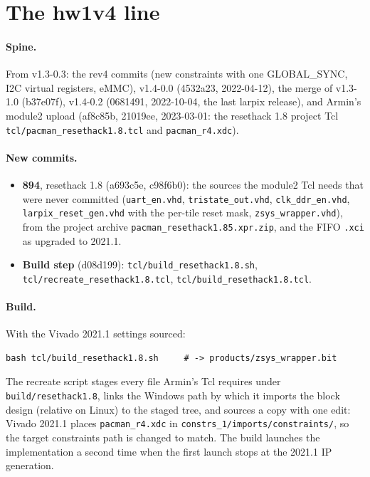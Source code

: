 \documentclass[11pt]{article}
\newcommand{\h}[1]{\texttt{#1}}
\begin{document}
\section{The hw1v4 line}

\paragraph{Spine.}  From v1.3-0.3: the rev4 commits (new constraints with one GLOBAL\_SYNC, I2C virtual
registers, eMMC), v1.4-0.0 (4532a23, 2022-04-12), the merge of v1.3-1.0 (b37e07f), v1.4-0.2 (0681491,
2022-10-04, the last larpix release), and Armin's module2 upload (af8c85b, 21019ee, 2023-03-01: the resethack 1.8
project Tcl \h{tcl/pacman\_resethack1.8.tcl} and \h{pacman\_r4.xdc}).

\paragraph{New commits.}
\begin{itemize}
\item \textbf{894}, resethack 1.8 (a693c5e, c98f6b0): the sources the module2 Tcl needs that were never
  committed (\h{uart\_en.vhd}, \h{tristate\_out.vhd}, \h{clk\_ddr\_en.vhd}, \h{larpix\_reset\_gen.vhd} with the
  per-tile reset mask, \h{zsys\_wrapper.vhd}), from the project archive \h{pacman\_resethack1.85.xpr.zip}, and the
  FIFO \h{.xci} as upgraded to 2021.1.
\item \textbf{Build step} (d08d199): \h{tcl/build\_resethack1.8.sh}, \h{tcl/recreate\_resethack1.8.tcl},
  \h{tcl/build\_resethack1.8.tcl}.
\end{itemize}

\paragraph{Build.}  With the Vivado 2021.1 settings sourced:
\begin{verbatim}
bash tcl/build_resethack1.8.sh     # -> products/zsys_wrapper.bit
\end{verbatim}
The recreate script stages every file Armin's Tcl requires under \h{build/resethack1.8}, links the Windows path
by which it imports the block design (relative on Linux) to the staged tree, and sources a copy with one edit:
Vivado 2021.1 places \h{pacman\_r4.xdc} in \h{constrs\_1/imports/constraints/}, so the target constraints path is
changed to match.  The build launches the implementation a second time when the first launch stops at the 2021.1
IP generation.
\end{document}
